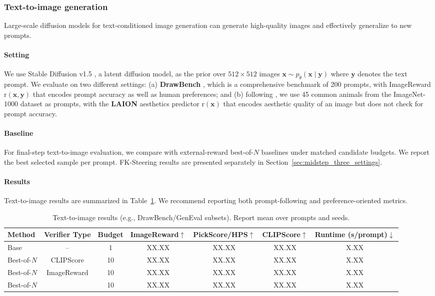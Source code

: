 \documentclass{article}
\newcommand{\method}{\text{Diffusion Ranker}\xspace}
\begin{document}
\subsubsection{Text-to-image generation}
Large-scale diffusion models for text-conditioned image generation can generate high-quality images and effectively generalize to new prompts.

\paragraph{Setting}
We use Stable Diffusion v1.5 \citep{rombach2022ldm}, a latent diffusion model, as the prior over $512 \times 512$ images $\mathbf{x} \sim p_{\theta}(\mathbf{x} \mid \mathbf{y})$ where $\mathbf{y}$ denotes the text prompt. We evaluate on two different settings: (a) \textbf{DrawBench} \citep{saharia2022photorealistic}, which is a comprehensive benchmark of 200 prompts, with ImageReward \citep{xu2023imagereward} $\mathrm{r}(\mathbf{x}, \mathbf{y})$ that encodes prompt accuracy as well as human preferences; and (b) following \citet{black2023consistency}, we use 45 common animals from the ImageNet-1000 dataset as prompts, with the \textbf{LAION} aesthetics predictor \citep{schuhmann2022laion} $\mathrm{r}(\mathbf{x})$ that encodes aesthetic quality of an image but does not check for prompt accuracy.

\paragraph{Baseline}
For final-step text-to-image evaluation, we compare \method with external-reward best-of-$N$ baselines under matched candidate budgets. We report the best selected sample per prompt. FK-Steering results are presented separately in Section~\ref{sec:midstep_three_settings}.

\paragraph{Results}
Text-to-image results are summarized in Table~\ref{tab:main_t2i}. We recommend reporting both prompt-following and preference-oriented metrics.

\begin{table}[htbp]
\centering
\caption{Text-to-image results (e.g., DrawBench/GenEval subsets). Report mean over prompts and seeds.}
\label{tab:main_t2i}
\begin{tabular}{lcccccc}
\toprule
Method & Verifier Type & Budget & ImageReward$\uparrow$ & PickScore/HPS$\uparrow$ & CLIPScore$\uparrow$ & Runtime (s/prompt)$\downarrow$ \\
\midrule
Base & -- & 1 & XX.XX & XX.XX & XX.XX & X.XX \\
Best-of-$N$ & CLIPScore & 10 & XX.XX & XX.XX & XX.XX & X.XX \\
Best-of-$N$ & ImageReward & 10 & XX.XX & XX.XX & XX.XX & X.XX \\
Best-of-$N$ & \method & 10 & XX.XX & XX.XX & XX.XX & X.XX \\
\bottomrule
\end{tabular}
\end{table}
\end{document}

